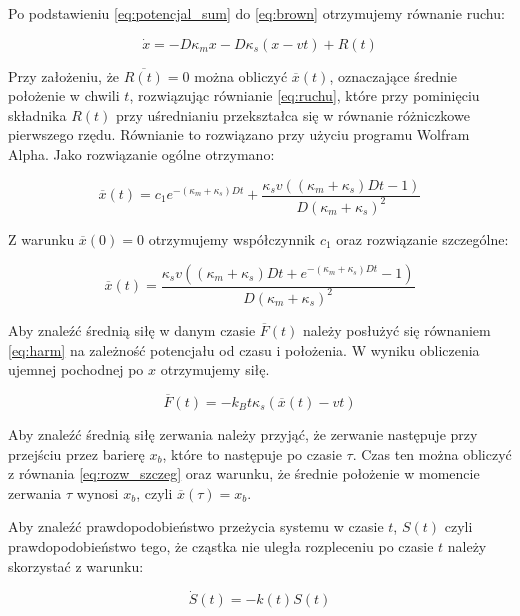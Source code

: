 Po podstawieniu \ref{eq:potencjal_sum} do \ref{eq:brown} otrzymujemy równanie ruchu:

\begin{equation} \dot{x}=-D\kappa_{m} x - D\kappa_{s} (x-vt) +R(t)\label{eq:ruchu}\end{equation}

Przy założeniu, że $\overline{R(t)}=0$ można obliczyć $\overline{x}(t)$, oznaczające średnie położenie w chwili $t$, rozwiązując równianie \ref{eq:ruchu}, które przy pominięciu składnika $R(t)$ przy uśrednianiu przekształca się w równanie różniczkowe pierwszego rzędu. Równianie to rozwiązano przy użyciu programu Wolfram Alpha\cite{wolfram}. Jako rozwiązanie ogólne otrzymano:

\begin{equation} \overline{x}(t)= c_{1}e^{-(\kappa_{m}+\kappa_{s})Dt} + \frac{\kappa_{s}v((\kappa_{m}+\kappa_{s})Dt -1 )}{D(\kappa_{m}+\kappa_{s})^2} \label{eq:rozw_og}\end{equation}

Z warunku $\overline{x}(0)=0$ otrzymujemy współczynnik $c_1$ oraz rozwiązanie szczególne:

\begin{equation} \overline{x}(t)= \frac{\kappa_{s}v((\kappa_{m}+\kappa_{s})Dt + e^{-(\kappa_{m}+\kappa_{s})Dt}-1 )}{D(\kappa_{m}+\kappa_{s})^2} \label{eq:rozw_szczeg}\end{equation}

Aby znaleźć średnią siłę w danym czasie $\overline{F}(t)$ należy posłużyć się równaniem \ref{eq:harm} na zależność potencjału od czasu i położenia. W wyniku obliczenia ujemnej pochodnej po $x$ otrzymujemy siłę.

\begin{equation} \overline{F}(t) = - k_{B}t\kappa_{s} ( \overline{x}(t) -v t)  \label{eq:sila_czas}\end{equation}

Aby znaleźć średnią siłę zerwania należy przyjąć, że zerwanie następuje przy przejściu przez barierę $x_b$, które to następuje po czasie $\tau$. Czas ten można obliczyć z równania \ref{eq:rozw_szczeg} oraz warunku, że średnie położenie w momencie zerwania $\tau$ wynosi $x_b$, czyli $\overline{x}(\tau)=x_b$.

Aby znaleźć prawdopodobieństwo przeżycia systemu w czasie $t$, $S(t)$ czyli prawdopodobieństwo tego, że cząstka nie uległa rozpleceniu po czasie $t$ należy skorzystać z warunku:

\begin{equation} \dot{S}(t)=-k(t)S(t) \label{eq:surv_prob}\end{equation}

